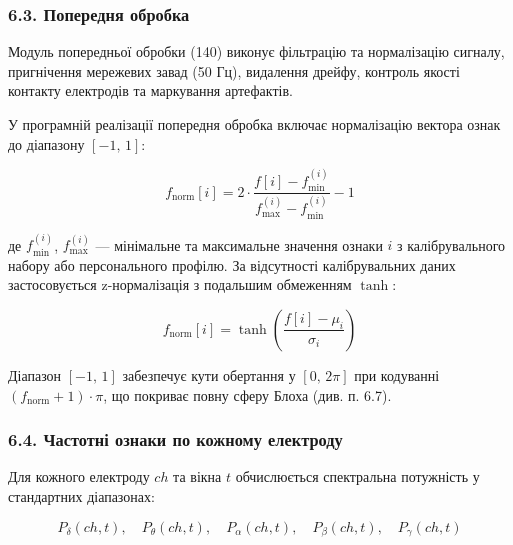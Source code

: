\documentclass[12pt,a4paper]{article}
\begin{document}
\subsubsection{6.3. Попередня обробка}\label{ux43fux43eux43fux435ux440ux435ux434ux43dux44f-ux43eux431ux440ux43eux431ux43aux430}



Модуль попередньої обробки (140) виконує фільтрацію та нормалізацію сигналу, пригнічення мережевих завад (50 Гц), видалення дрейфу, контроль якості контакту електродів та маркування артефактів.



У програмній реалізації попередня обробка включає нормалізацію вектора ознак до діапазону \([-1,\,1]\):



\[f_{\text{norm}}[i] = 2 \cdot \frac{f[i] - f_{\min}^{(i)}}{f_{\max}^{(i)} - f_{\min}^{(i)}} - 1\]



де \(f_{\min}^{(i)}\), \(f_{\max}^{(i)}\) --- мінімальне та максимальне значення ознаки \(i\) з калібрувального набору або персонального профілю. За відсутності калібрувальних даних застосовується z-нормалізація з подальшим обмеженням \(\tanh\):



\[f_{\text{norm}}[i] = \tanh\!\left(\frac{f[i] - \mu_i}{\sigma_i}\right)\]



Діапазон \([-1,\,1]\) забезпечує кути обертання у \([0,\,2\pi]\) при кодуванні \((f_{\text{norm}} + 1) \cdot \pi\), що покриває повну сферу Блоха (див. п. 6.7).



\subsubsection{6.4. Частотні ознаки по кожному електроду}\label{ux447ux430ux441ux442ux43eux442ux43dux456-ux43eux437ux43dux430ux43aux438-ux43fux43e-ux43aux43eux436ux43dux43eux43cux443-ux435ux43bux435ux43aux442ux440ux43eux434ux443}



Для кожного електроду \(ch\) та вікна \(t\) обчислюється спектральна потужність у стандартних діапазонах:



\[P_\delta(ch, t),\quad P_\theta(ch, t),\quad P_\alpha(ch, t),\quad P_\beta(ch, t),\quad P_\gamma(ch, t)\]
\end{document}
